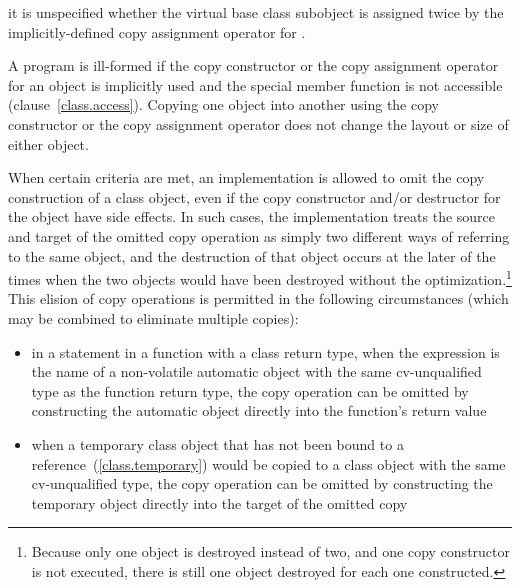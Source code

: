 it is unspecified whether the virtual base class subobject
is assigned twice by the implicitly-defined copy assignment operator for
.
\exitexampleb

\pnum
{}%
%
A program is ill-formed if the copy constructor or the copy assignment
operator for an object is implicitly used and the special member function
is not accessible (clause~\ref{class.access}).
\enternote
Copying one object into another using the copy constructor or
the copy assignment operator does not change the layout or size of either
object.
\exitnote

\pnum
{}%
%
%
When certain criteria are met, an implementation is
allowed to omit the copy construction of a class object,
even if the copy constructor and/or destructor for the
object have
%
side effects.  In such cases, the
implementation treats the source and target of the
omitted copy operation as simply two different ways of
referring to the same object, and the destruction of
that object occurs at the later of the times when the
two objects would have been destroyed without the
optimization.\footnote{Because only one object is destroyed instead of two,
and one copy constructor
is not executed, there is still one object destroyed for each one constructed.}
This elision of copy operations
is permitted in the
following circumstances (which may be combined to
eliminate multiple copies):

\begin{itemize}
\item in a  statement in a function with a class return type,
when the expression is the name of a non-volatile
automatic object
with the same cv-unqualified type as
the function return type, the copy operation can be
omitted by constructing the automatic object directly
into the function's return value

\item when a temporary class object that has not been bound to a
reference~(\ref{class.temporary}) would be copied to a class object with
the same cv-unqualified type, the copy operation can be omitted by constructing
the temporary object directly into the target of the omitted copy
\end{itemize}

\enterexample

